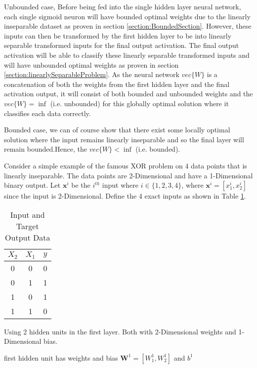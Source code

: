 \documentclass[a4paper,12pt]{article}
\begin{document}
Unbounded case,
Before being fed into the single hidden layer neural network, each single sigmoid neuron will have bounded optimal weights due to the linearly inseparable dataset as proven in section \ref{section:BoundedSection}. However, these inputs can then be transformed by the first hidden layer to be into linearly separable transformed inputs for the final output activation. The final output activation will be able to classify these linearly separable transformed inputs and will have unbounded optimal weights as proven in section \ref{section:linearlySeparableProblem}. As the neural network $vec\{W\}$ is a concatenation of both the weights from the first hidden layer and the final activation output, it will consist of both bounded and unbounded weights and the $vec\{W\} = \inf$ (i.e. unbounded) for this globally optimal solution where it classifies each data correctly. 

Bounded case, 
we can of course show that there exist some locally optimal solution where the input remains linearly inseparable and so the final layer will remain bounded.Hence, the $vec\{W\} < \inf$ (i.e. bounded). 

Consider a simple example of the famous XOR problem on 4 data points that is linearly inseparable. 
The data points are 2-Dimensional and have a 1-Dimensional binary output. 
Let $\mathbf{x}^{i}$ be the $i^{th}$ input where $i \in \{1, 2, 3, 4\}$, where
$\mathbf{x}^{i} = [x_{1}^{i}, x_{2}^{i}]$ since the input is 2-Dimensional. 
Define the 4 exact inputs as shown in Table \ref{table:TruthTable}.

\begin{table}[ht]
\centering %
\caption{Input and Target Output Data} %
\label{table:TruthTable} %
\begin{tabular}{c c c} %
\hline %
$X_{2}$ & $X_{1}$ & $y$ \\ [0.5ex] 
\hline
0 & 0 & 0 \\
0 & 1 & 1 \\
1 & 0 & 1 \\
1 & 1 & 0 \\ [1ex] %
\hline %
\end{tabular}
\end{table}

Using 2 hidden units in the first layer. Both with 2-Dimensional weights and  1-Dimensional bias. 

first hidden unit has weights and bias
$\mathbf{W}^{1} = [W^{1}_{1},W^{1}_{2}]$ and $b^{1}$
\end{document}
